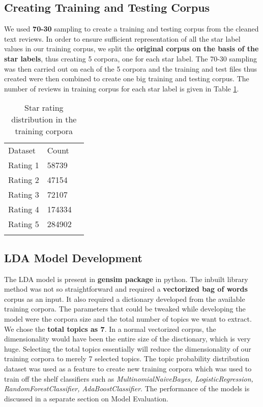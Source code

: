 \documentclass[paper=a4, fontsize=11pt]{scrartcl} %
\numberwithin{equation}{section} %
\numberwithin{figure}{section} %
\numberwithin{table}{section} %
\begin{document}
\subsection{Creating Training and Testing Corpus}
We used \textbf{70-30} sampling to create a training and testing corpus from the cleaned text reviews. In order to ensure sufficient representation of all the star label values in our training corpus, we split the \textbf{original corpus on the basis of the star labels}, thus creating 5 corpora, one for each star label. The 70-30 sampling was then carried out on each of the 5 corpora and the training and test files thus created were then combined to create one big training and testing corpus. The number of reviews in training corpus for each star label is given  in Table \ref{corpus_size}.
\begin{table}[!htb]
 \centering
 \caption{Star rating distribution in the training corpora}
 \label{corpus_size}
 \begin{tabular}{l l l} 
    \noalign{\smallskip}\hline\noalign{\smallskip}
    Dataset & Count \\
    \noalign{\smallskip}\hline\noalign{\smallskip}
    Rating 1 &58739\\
    Rating 2 &47154\\
    Rating 3 &72107\\
    Rating 4 &174334\\
    Rating 5 &284902\\
    \noalign{\smallskip}\hline
  \end{tabular} 
\end{table}  
\subsection{LDA Model Development}
The LDA\cite{lda} model is present in \textbf{gensim package} in python. The inbuilt library method was not so straightforward and required a \textbf{vectorized bag of words} corpus as an input. It also required a dictionary developed from the available training corpora. The parameters that could be tweaked while developing the model were the corpora size and the total number of topics we want to extract. We chose the \textbf{total topics as 7}. In a normal vectorized corpus, the dimensionality would have been the entire size of the disctionary, which is very huge. Selecting the total topics essentially will reduce the dimensionality of our training corpora to merely 7 selected topics. The topic probability distribution dataset was used as a feature to create new training corpora which was used to train off the shelf classifiers such as \textit{MultinomialNaiveBayes, LogisticRegression, RandomForestClassifier, AdaBoostClassifier}. The performance of the models is discussed in a separate section on Model Evaluation.
\end{document}
